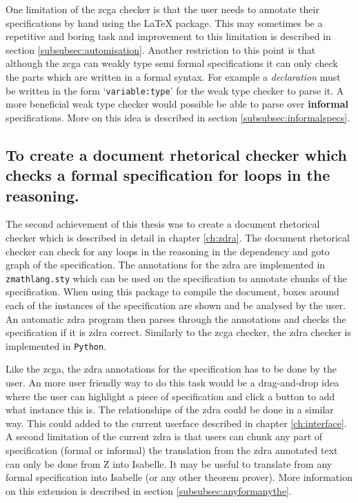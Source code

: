 One limitation of the \gls{zcga} checker is that the user needs to annotate
their specifications by hand using the \LaTeX{} package. This may sometimes be a
repetitive and boring task and improvement to this limitation is described in
section \ref{subsubsec:automisation}. Another restriction to this point is that
although the \gls{zcga} can weakly type semi formal specifications it can only
check the parts which are written in a formal syntax. For example a
\textit{declaration} must be written in the form `\texttt{variable:type}' for
the weak type checker to parse it. A more beneficial weak type checker would
possible be able to parse over \textbf{informal} specifications. More on this
idea is described in section \ref{subsubsec:informalspecs}.

\subsection{To create a document rhetorical checker which checks a formal specification for loops in the reasoning.}

The second achievement of this thesis was to create a document rhetorical
checker which is described in detail in chapter \ref{ch:zdra}. The document
rhetorical checker can check for any loops in the reasoning in the dependency
and goto graph of the specification. The annotations for the \gls{zdra} are
implemented in \texttt{zmathlang.sty} which can be used on the specification to
annotate chunks of the specification. When using this package to compile the
document, boxes around each of the instances of the specification are shown and
be analysed by the user. An automatic \gls{zdra} program then parses through the
annotations and checks the specification if it is \gls{zdra} correct. Similarly
to the \gls{zcga} checker, the \gls{zdra} checker is implemented in
\texttt{Python}.

Like the \gls{zcga}, the \gls{zdra} annotations for the specification has to be
done by the user. An more user friendly way to do this task would be a
drag-and-drop idea where the user can highlight a piece of specification and
click a button to add what instance this is. The relationships of the \gls{zdra}
could be done in a similar way. This could added to the current userface
described in chapter \ref{ch:interface}. A second limitation of the current
\gls{zdra} is that users can chunk any part of specification (formal or
informal) the translation from the \gls{zdra} annotated text can only be done
from Z into Isabelle. It may be useful to translate from any formal
specification into Isabelle (or any other theorem prover). More information on
this extension is described in section \ref{subsubsec:anyformanythe}.

